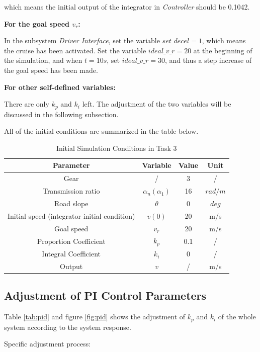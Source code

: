 \documentclass[12pt]{article}
\begin{document}
which means the initial output of the integrator in \textit{Controller} should be 0.1042.

\textbf{For the goal speed $v_r$:}

In the subsystem \textit{Driver Interface}, set the variable $set\_decel = 1$, which means the cruise has been activated. Set the variable $ideal\_v\_r = 20$ at the beginning of the simulation, and when $t=10s$, set $ideal\_v\_r = 30$, and thus a step increase of the goal speed has been made.

\textbf{For other self-defined variables:}

There are only $k_p$ and $k_i$ left. The adjustment of the two variables will be discussed in the following subsection.

All of the initial conditions are summarized in the table below.

\begin{table}[htbp]
    \centering
    \begin{tabular}{cccc}
       \hline
       Parameter & Variable & Value & Unit \\
       \hline
       Gear & / & 3 & / \\
       Transmission ratio & $\alpha_n (\alpha_1)$ & 16 & $rad/m$\\
       Road slope & $\theta$ & 0 & $deg$ \\ 
       Initial speed (integrator initial condition) & $v(0)$ & 20 & m/s \\
       Goal speed & $v_r$ & 20 & m/s \\
       Proportion Coefficient & $k_p$ & 0.1 & / \\
       Integral Coefficient & $k_i$ & 0 & / \\
       Output & $v$ & / & m/s \\
    \hline
    \end{tabular}
    \caption{Initial Simulation Conditions in Task 3}
    \label{tab:task3_simcondition}
\end{table}

\subsection{Adjustment of PI Control Parameters}

Table \ref{tab:pid} and figure \ref{fig:pid} shows the adjustment of $k_p$ and $k_i$ of the whole system according to the system response.

Specific adjustment process:
\end{document}
